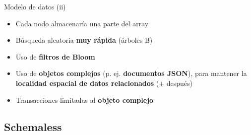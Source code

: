 \documentclass[14pt]{beamer}
\begin{document}
\begin{frame}
\begin{overlayarea}{\textwidth}{.8\textheight}
{\begin{block}{Modelo de datos (ii)}
\begin{itemize}
\begin{itemize}
\item Cada nodo almacenaría una parte del array
\item Búsqueda aleatoria {\bf muy rápida} (árboles B)
\item Uso de {\bf filtros de Bloom}
\item Uso de {\bf objetos complejos} (p. ej. {\bf documentos JSON}),
  para mantener la {\bf localidad espacial de datos relacionados} (+
  después)
\item Transacciones limitadas al {\bf objeto complejo}
\end{itemize}
\end{itemize}
\end{block}%
}%
\end{overlayarea}
\end{frame}

\subsection{Schemaless}
\end{document}
